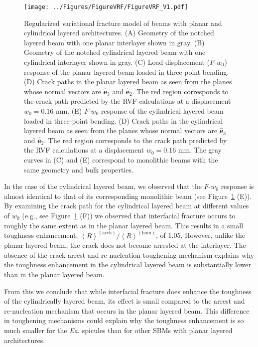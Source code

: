 \documentclass[12pt,onecolumn]{article}
\makeatletter
\newcommand{\ey}{{\bm{\hat{e}}}_2}
\newcommand{\ez}{{\bm{\hat{e}}}_3}
\newcommand{\EA}{\textit{Ea.\@}\xspace}
\makeatother
\begin{document}
\begin{bibunit}
			\begin{figure}[ht!]
			\texttt{[image: ../Figures/FigureVRF/FigureVRF\_V1.pdf]}
			\caption{Regularized variational fracture model of beams with planar and cylindrical layered architectures. (A) Geometry of the notched layered beam with one planar interlayer shown in gray. (B) Geometry of the notched cylindrical layered beam with one cylindrical interlayer shown in gray. (C) Load displacement ($F$-$w_0$) response of the planar layered beam loaded in three-point bending.  (D) Crack paths in the planar layered beam as seen from the planes whose normal vectors are $\ez$ and $\ey$. The red region corresponds to the crack path predicted by the RVF calculations at a displacement $w_0=0.16$ mm. (E) $F$-$w_0$ response of the cylindrical layered beam loaded in three-point bending.  (D) Crack paths in the cylindrical layered beam as seen from the planes whose normal vectors are $\ez$ and $\ey$. The red region corresponds to the crack path predicted by the RVF calculations at a displacement $w_0=0.16$ mm. The gray curves in (C) and (E) correspond to monolithic beams with the same geometry and bulk properties.}
			\label{fig:VF}
			\end{figure}

In the case of the cylindrical layered beam, we observed that the $F$-$w_0$ response is almost identical to that of its corresponding monolithic beam (see Figure~\ref{fig:VF} (E)). By examining the crack path for the cylindrical layered beam at different values of $w_0$ (e.g., see Figure~\ref{fig:VF} (F)) we observed that interfacial fracture occurs to roughly the same extent as in the planar layered beam. This results in a small toughness enhancement, $\left< R\right>^{(\mathrm{arch})}/\left< R\right>^{(\mathrm{hom})}$, of 1.05. However, unlike the planar layered beam, the crack does not become arrested at the interlayer. The absence of the crack arrest and re-nucleation toughening mechanism explains why the toughness enhancement in the cylindrical layered beam is substantially lower than in the planar layered beam.

From this we conclude that while interfacial fracture does enhance the toughness of the cylindrically layered beam, its effect is small compared to the arrest and re-nucleation mechanism that occurs in the planar layered beam. This difference in toughening mechanisms could explain why the toughness enhancement is so much smaller for the \EA spicules than for other SBMs with planar layered architectures.
	

\end{bibunit}
\end{document}
